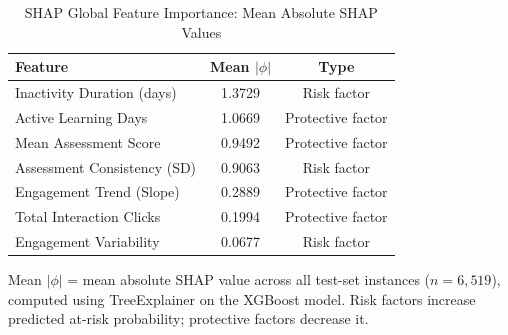 \begin{table}[!t]
  \renewcommand{\arraystretch}{1.25}
  \caption{SHAP Global Feature Importance: Mean Absolute SHAP Values}
  \label{tab:shap}
  \centering
  \begin{tabular}{lcc}
    \hline
    \textbf{Feature} & \textbf{Mean $|\phi|$} & \textbf{Type} \\
    \hline
    Inactivity Duration (days)   & 1.3729 & Risk factor \\
    Active Learning Days         & 1.0669 & Protective factor \\
    Mean Assessment Score        & 0.9492 & Protective factor \\
    Assessment Consistency (SD)  & 0.9063 & Risk factor \\
    Engagement Trend (Slope)     & 0.2889 & Protective factor \\
    Total Interaction Clicks     & 0.1994 & Protective factor \\
    Engagement Variability       & 0.0677 & Risk factor \\
    \hline
  \end{tabular}
  \vspace{1mm}
  \begin{flushleft}
    \small Mean $|\phi|$ = mean absolute SHAP value across all test-set instances
    ($n = 6{,}519$), computed using TreeExplainer on the XGBoost model.
    Risk factors increase predicted at-risk probability;
    protective factors decrease it.
  \end{flushleft}
\end{table}

%
%
%


